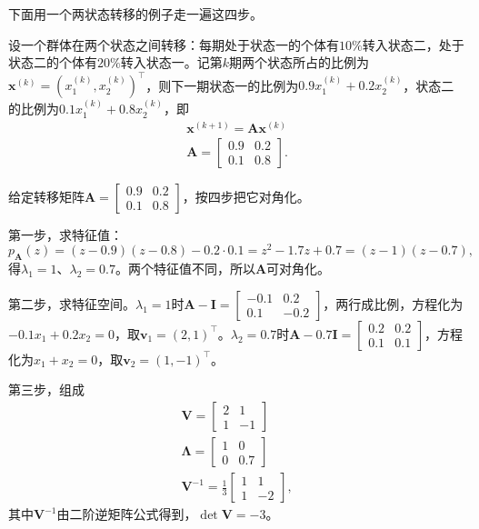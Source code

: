下面用一个两状态转移的例子走一遍这四步。

设一个群体在两个状态之间转移：每期处于状态一的个体有$10\%$转入状态二，处于状态二的个体有$20\%$转入状态一。记第$k$期两个状态所占的比例为$\bm x^{(k)}=(x_1^{(k)},x_2^{(k)})^{\top}$，则下一期状态一的比例为$0.9x_1^{(k)}+0.2x_2^{(k)}$，状态二的比例为$0.1x_1^{(k)}+0.8x_2^{(k)}$，即
\[
\begin{gathered}
\bm x^{(k+1)}=\bm A\bm x^{(k)}\\
\bm A=\begin{bmatrix}0.9&0.2\\0.1&0.8\end{bmatrix}.
\end{gathered}
\]
\begin{example}[两状态转移矩阵的对角化]
\label{ex:ls-transition-matrix-diagonalization}
给定转移矩阵$\bm A=\left[\begin{smallmatrix}0.9&0.2\\0.1&0.8\end{smallmatrix}\right]$，按四步把它对角化。

第一步，求特征值：
\[
 p_{\bm A}(z)=(z-0.9)(z-0.8)-0.2\cdot0.1=z^2-1.7z+0.7=(z-1)(z-0.7),
\]
得$\lambda_1=1$、$\lambda_2=0.7$。两个特征值不同，所以$\bm A$可对角化。

第二步，求特征空间。$\lambda_1=1$时$\bm A-\bm I=\left[\begin{smallmatrix}-0.1&0.2\\0.1&-0.2\end{smallmatrix}\right]$，两行成比例，方程化为$-0.1x_1+0.2x_2=0$，取$\bm v_1=(2,1)^{\top}$。$\lambda_2=0.7$时$\bm A-0.7\bm I=\left[\begin{smallmatrix}0.2&0.2\\0.1&0.1\end{smallmatrix}\right]$，方程化为$x_1+x_2=0$，取$\bm v_2=(1,-1)^{\top}$。

第三步，组成
\[
\begin{gathered}
\bm V=\begin{bmatrix}2&1\\1&-1\end{bmatrix}\\
\bm\Lambda=\begin{bmatrix}1&0\\0&0.7\end{bmatrix}\\
\bm V^{-1}=\frac13\begin{bmatrix}1&1\\1&-2\end{bmatrix},
\end{gathered}
\]
其中$\bm V^{-1}$由二阶逆矩阵公式得到，$\det\bm V=-3$。


\end{example}
